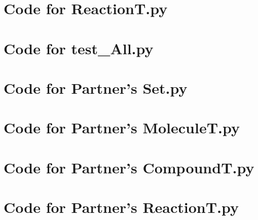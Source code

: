\documentclass[12pt]{article}
\begin{document}
\noindent 

\newpage

\section{Code for ReactionT.py}

\noindent 

\newpage

\section{Code for test\_All.py}

\noindent 

\newpage

\section{Code for Partner's Set.py}

\noindent 

\newpage

\section{Code for Partner's MoleculeT.py}

\noindent 

\newpage

\section{Code for Partner's CompoundT.py}

\noindent 

\newpage

\section{Code for Partner's ReactionT.py}

\noindent 
\end{document}
